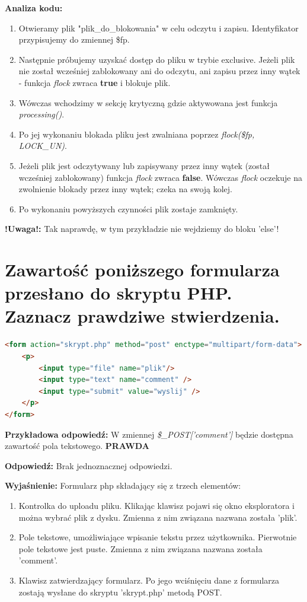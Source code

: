 \textbf{Analiza kodu:}
\begin{enumerate}
\item
Otwieramy plik "plik\_do\_blokowania" w celu odczytu i zapisu. Identyfikator przypisujemy do zmiennej \$fp.
\item
Następnie próbujemy uzyskać dostęp do pliku w trybie exclusive.
Jeżeli plik nie został wcześniej zablokowany ani do odczytu, ani zapisu przez inny wątek - funkcja \textit{flock} zwraca \textbf{true} i blokuje plik.
\item
Wówczas wchodzimy w sekcję krytyczną gdzie aktywowana jest funkcja \textit{processing()}.
\item
Po jej wykonaniu blokada pliku jest zwalniana poprzez \textit{flock(\$fp, LOCK\_UN)}.
\item
Jeżeli plik jest odczytywany lub zapisywany przez inny wątek (został wcześniej zablokowany) funkcja \textit{flock} zwraca \textbf{false}.
Wówczas \textit{flock} oczekuje na zwolnienie blokady przez inny wątek; czeka na swoją kolej.
\item
Po wykonaniu powyższych czynności plik zostaje zamknięty.
\end{enumerate}

\textbf{!Uwaga!: }Tak naprawdę, w tym przykładzie nie wejdziemy do bloku 'else'!

\section{Zawartość poniższego formularza przesłano do skryptu PHP. Zaznacz prawdziwe stwierdzenia.}
\begin{lstlisting}[language=html]
<form action="skrypt.php" method="post" enctype="multipart/form-data">
	<p>
		<input type="file" name="plik"/>
		<input type="text" name="comment" />
		<input type="submit" value="wyslij" />
	</p>
</form>
\end{lstlisting}

\noindent
{\textbf{Przykładowa odpowiedź:}}
W zmiennej \textit{\$\_POST['comment']} będzie dostępna zawartość pola tekstowego.
\textbf{PRAWDA}

\vspace{0.4cm}
\noindent
\textbf{Odpowiedź:}
Brak jednoznacznej odpowiedzi.

\vspace{0.4cm}
\noindent
\textbf{Wyjaśnienie:}
Formularz php składający się z trzech elementów:
\begin{enumerate}
\item
Kontrolka do uploadu pliku. Klikając klawisz pojawi się okno eksploratora i można wybrać plik z dysku. Zmienna z nim związana nazwana została 'plik'.
\item
Pole tekstowe, umożliwiające wpisanie tekstu przez użytkownika. Pierwotnie pole tekstowe jest puste. Zmienna z nim związana nazwana została 'comment'.
\item
Klawisz zatwierdzający formularz. Po jego wciśnięciu dane z formularza zostają wysłane do skryptu 'skrypt.php' metodą POST.
\end{enumerate}

